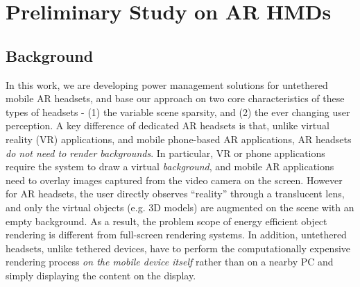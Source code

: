 \section{Preliminary Study on AR HMDs}
\label{sec:preliminary}

\subsection{Background}
\label{sec:background}

%

\begin{comment}

However, prior studies raise three questions that need to be answered
when designing an energy management scheme using perceptual information;
%
(1) What sources of information on human perception can we access?
(2) How can we recognize human perception using sensory data?, and
(3) What can we do to reduce energy usage?
%
Our approach is to address the energy efficiency problem on mobile HMDs
by answering each of these three questions.

\end{comment}


In this work, we are developing power management solutions for untethered mobile AR headsets, and base our approach on two core characteristics of these types of headsets - (1) the variable scene sparsity, and (2) the ever changing user perception. A key difference of dedicated AR headsets is that, unlike virtual reality (VR) applications, and mobile phone-based AR applications, AR headsets \emph{do not need to render backgrounds}. In particular, VR or phone applications require the system to draw a virtual \textit{background}, and mobile AR applications need to overlay images captured from the video camera on the screen. However for AR headsets, the user directly observes ``reality'' through a translucent lens, and only the virtual objects (e.g. 3D models) are augmented on the scene with an empty background. As a result, the problem  scope of energy efficient object rendering is different from full-screen rendering systems. In addition, untethered headsets, unlike tethered devices, have to perform the computationally expensive rendering process \textit{on the mobile device itself} rather than on a nearby PC and simply displaying the content on the display.

